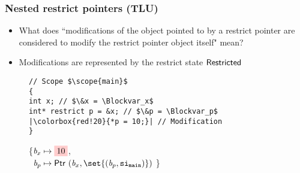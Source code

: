 \begin{frame}[fragile]
\frametitle{Nested restrict pointers (TLU)}
\begin{itemize}
    \item What does ``modifications of the object pointed to by a restrict pointer are considered to modify the restrict pointer object itself" mean?
    \item Modifications are represented by the restrict state \colorbox{blue!20}{$\mathsf{Restricted}$}
\end{itemize}

\begin{figure}[h]
\centering
\begin{minipage}{.5\textwidth}
\begin{verbatim}
// Scope $\scope{main}$
{
int x; // $\&x = \Blockvar_x$
int* restrict p = &x; // $\&p = \Blockvar_p$
|\colorbox{red!20}{*p = 10;}| // Modification
}
\end{verbatim}
\end{minipage}%
\begin{minipage}{.5\textwidth}
\executionannotation
{
    \{$\Blockvar_x \mapsto \colorbox{red!20}{10}$, \\
        \ $\Blockvar_p \mapsto \ptr{(\Blockvar_x, \set{(\Blockvar_p, \scope{main})})}$
    \}
}
{
}
\end{minipage}
\end{figure}


\end{frame}



